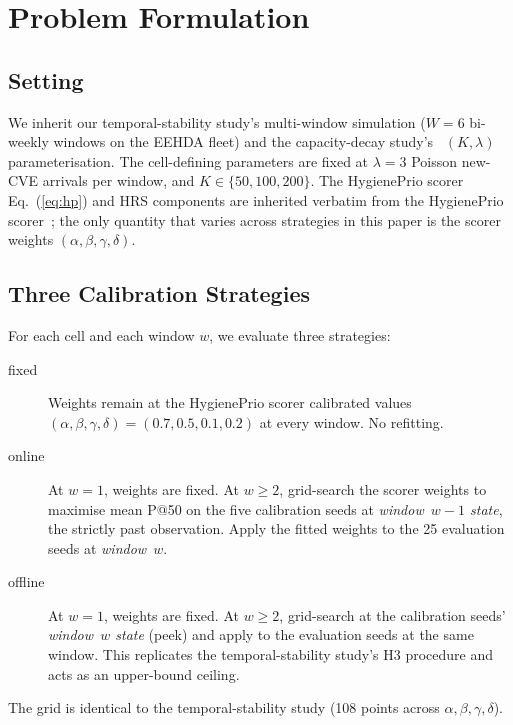 \section{Problem Formulation}
\label{sec:problem}

\subsection{Setting}

We inherit our temporal-stability study's multi-window simulation
($W = 6$ bi-weekly windows on the EEHDA fleet) and the capacity-decay study's~\cite{paper6capacity}
$(K, \lambda)$ parameterisation. The cell-defining parameters are
fixed at $\lambda = 3$ Poisson new-CVE arrivals per window, and
$K \in \{50, 100, 200\}$. The HygienePrio scorer Eq.~(\ref{eq:hp}) and
HRS components are inherited verbatim from the HygienePrio scorer~\cite{paper4hygieneprio};
the only quantity that varies across strategies in this paper is the
scorer weights $(\alpha, \beta, \gamma, \delta)$.

\subsection{Three Calibration Strategies}

For each cell and each window $w$, we evaluate three strategies:

\begin{description}
\item[\textsf{fixed}] Weights remain at the HygienePrio scorer calibrated values
$(\alpha, \beta, \gamma, \delta) = (0.7, 0.5, 0.1, 0.2)$ at every
window. No refitting.
\item[\textsf{online}] At $w = 1$, weights are \textsf{fixed}.
At $w \geq 2$, grid-search the scorer weights to maximise mean P@50 on
the five calibration seeds at \textit{window~$w-1$ state}, the
strictly past observation. Apply the fitted weights to the 25
evaluation seeds at \textit{window~$w$}.
\item[\textsf{offline}] At $w = 1$, weights are \textsf{fixed}.
At $w \geq 2$, grid-search at the calibration seeds' \textit{window~$w$
state} (peek) and apply to the evaluation seeds at the same window. This
replicates the temporal-stability study's H3 procedure and acts as an upper-bound ceiling.
\end{description}

The grid is identical to the temporal-stability study (108 points across
$\alpha, \beta, \gamma, \delta$).


